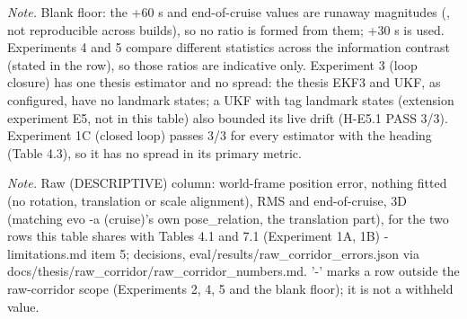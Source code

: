 \begin{table}[htbp]
\textit{Note.} Blank floor: the +60 s and end-of-cruise values are runaway magnitudes (\textdagger{}, not reproducible across builds), so no ratio is formed from them; +30 s is used. Experiments 4 and 5 compare different statistics across the information contrast (stated in the row), so those ratios are indicative only. Experiment 3 (loop closure) has one thesis estimator and no spread: the thesis EKF3 and UKF, as configured, have no landmark states; a UKF with tag landmark states (extension experiment E5, not in this table) also bounded its live drift (H-E5.1 PASS 3/3). Experiment 1C (closed loop) passes 3/3 for every estimator with the heading (Table 4.3), so it has no spread in its primary metric.\par
\textit{Note.} Raw (DESCRIPTIVE) column: world-frame position error, nothing fitted (no rotation, translation or scale alignment), RMS and end-of-cruise, 3D (matching evo -a (cruise)'s own pose\_relation, the translation part), for the two rows this table shares with Tables 4.1 and 7.1 (Experiment 1A, 1B) - limitations.md item 5; decisions, eval/results/raw\_corridor\_errors.json via docs/thesis/raw\_corridor/raw\_corridor\_numbers.md. '-' marks a row outside the raw-corridor scope (Experiments 2, 4, 5 and the blank floor); it is not a withheld value.\par
\end{table}
